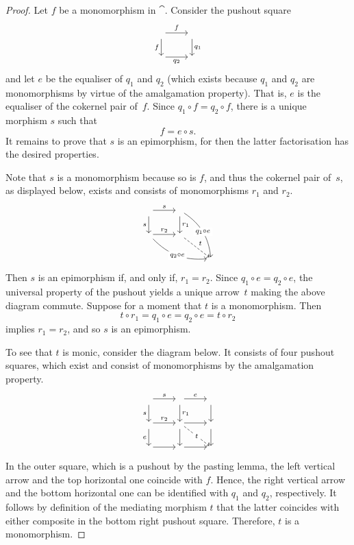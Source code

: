 \documentclass[a4paper,10pt,reqno]{amsart}
\theoremstyle{definition}
\theoremstyle{remark}
\begin{document}
	\begin{proof}
	Let $f$ be a monomorphism in $\cat$. Consider the pushout square
	\[\begin{tikzcd}
	 \arrow{r}{f} \arrow{d}[swap]{f} & {} \arrow{d}{q_{1}} \\
	\arrow{r}[swap]{q_{2}} {} & {} 
	\end{tikzcd}\]
	and let $e$ be the equaliser of $q_{1}$ and $q_{2}$ (which exists because $q_{1}$ and $q_{2}$ are monomorphisms by virtue of the amalgamation property). That is, $e$ is the equaliser of the cokernel pair of~$f$.
	Since $q_1\circ f=q_2\circ f$, there is a unique morphism $s$ such that
	\[
	f=e\circ s.
	\]
	It remains to prove that $s$ is an epimorphism, for then the latter factorisation has the desired properties.

	Note that $s$ is a monomorphism because so is $f$, and thus the cokernel pair of~$s$, as displayed below, exists and consists of monomorphisms $r_1$ and $r_2$.
	\[\begin{tikzcd}
{} \arrow{r}{s} \arrow{d}[swap]{s} & {} \arrow{d}{r_{1}} \arrow[bend left=25]{ddr}[description]{q_{1}\circ e} & {} \\
\arrow{r}{r_{2}} \arrow[bend right=25]{drr}[description]{q_{2}\circ e} {} & {} \arrow[dashed]{dr}{t}  & {} \\
{} & {} & {} 
\end{tikzcd}\]
	Then $s$ is an epimorphism if, and only if, $r_1=r_2$. Since $q_{1}\circ e=q_{2}\circ e$, the universal property of the pushout yields a unique arrow~$t$ making the above diagram commute. Suppose for a moment that $t$ is a monomorphism. Then
	\[
	t\circ r_{1} = q_{1}\circ e = q_{2}\circ e = t\circ r_{2}
	\]
	implies $r_{1}=r_{2}$, and so $s$ is an epimorphism.

	To see that $t$ is monic, consider the diagram below. It consists of four pushout squares, which exist and consist of monomorphisms by the amalgamation property.
	\[\begin{tikzcd}
	{} \arrow{r}{s} \arrow{d}[swap]{s} & {} \arrow{r}{e} \arrow{d}{r_{1}} & {} \arrow{d} \\
	{} \arrow{r}{r_{2}} \arrow{d}[swap]{e} & {} \arrow{r} \arrow{d}  \arrow[dashed]{dr}[description]{t} & {} \arrow{d}  \\
	{} \arrow{r} & {} \arrow{r}  & {} 
	\end{tikzcd}\]
	In the outer square, which is a pushout by the pasting lemma, the left vertical arrow and the top horizontal one coincide with $f$. Hence, the right vertical arrow and the bottom horizontal one can be identified with $q_{1}$ and $q_{2}$, respectively. It follows by definition of the mediating morphism $t$ that the latter coincides with either composite in the bottom right pushout square. Therefore, $t$ is a monomorphism.
	\end{proof}
\end{document}
